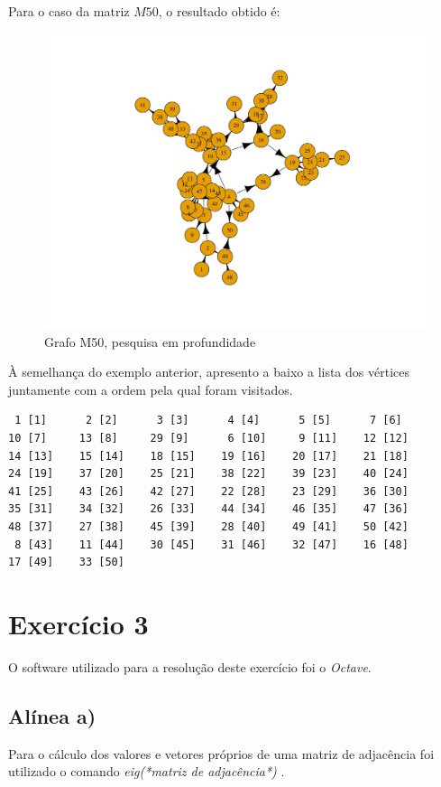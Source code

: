\documentclass[a4paper,12pt]{report}
\begin{document}
Para o caso da matriz $M50$, o resultado obtido é:
\begin{figure}[H]
    \centering
        \includegraphics[scale=0.25]{img/dfsM50.pdf}
    \caption{Grafo M50, pesquisa em profundidade}
    \label{fig:dfsP}
\end{figure}

À semelhança do exemplo anterior, apresento a baixo a lista dos vértices juntamente com a ordem pela qual foram visitados.

\begin{lstlisting}
 1 [1]      2 [2]      3 [3]      4 [4]      5 [5]      7 [6]
10 [7]     13 [8]     29 [9]      6 [10]     9 [11]    12 [12]
14 [13]    15 [14]    18 [15]    19 [16]    20 [17]    21 [18]
24 [19]    37 [20]    25 [21]    38 [22]    39 [23]    40 [24]
41 [25]    43 [26]    42 [27]    22 [28]    23 [29]    36 [30]
35 [31]    34 [32]    26 [33]    44 [34]    46 [35]    47 [36]
48 [37]    27 [38]    45 [39]    28 [40]    49 [41]    50 [42]
 8 [43]    11 [44]    30 [45]    31 [46]    32 [47]    16 [48] 
17 [49]    33 [50] 
\end{lstlisting}


\section{Exercício 3}

O software utilizado para a resolução deste exercício foi o \textit{Octave}.

\subsection*{Alínea a)}
Para o cálculo dos valores e vetores próprios de uma matriz de adjacência foi utilizado o comando \textit{eig(*matriz de adjacência*)} \cite{WEBSITE1}.
\end{document}
